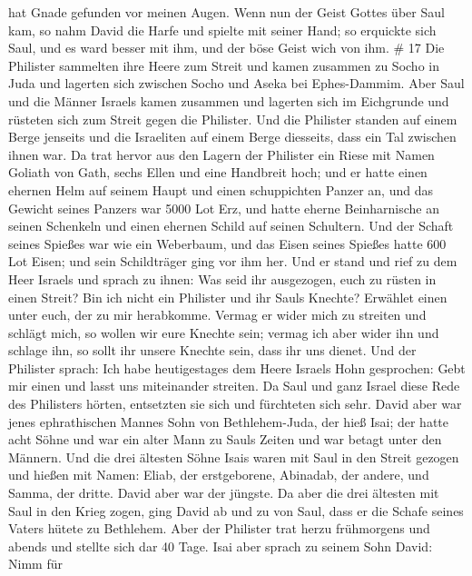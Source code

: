 hat Gnade gefunden vor meinen Augen.  Wenn nun der Geist
Gottes über Saul kam, so nahm David die Harfe und spielte mit seiner
Hand; so erquickte sich Saul, und es ward besser mit ihm, und der böse
Geist wich von ihm. \# 17  Die Philister sammelten ihre
Heere zum Streit und kamen zusammen zu Socho in Juda und lagerten sich
zwischen Socho und Aseka bei Ephes-Dammim.  Aber Saul und
die Männer Israels kamen zusammen und lagerten sich im Eichgrunde und
rüsteten sich zum Streit gegen die Philister.  Und die
Philister standen auf einem Berge jenseits und die Israeliten auf einem
Berge diesseits, dass ein Tal zwischen ihnen war.  Da trat
hervor aus den Lagern der Philister ein Riese mit Namen Goliath von
Gath, sechs Ellen und eine Handbreit hoch;  und er hatte
einen ehernen Helm auf seinem Haupt und einen schuppichten Panzer an,
und das Gewicht seines Panzers war 5000 Lot Erz,  und hatte
eherne Beinharnische an seinen Schenkeln und einen ehernen Schild auf
seinen Schultern.  Und der Schaft seines Spießes war wie ein
Weberbaum, und das Eisen seines Spießes hatte 600 Lot Eisen; und sein
Schildträger ging vor ihm her.  Und er stand und rief zu dem
Heer Israels und sprach zu ihnen: Was seid ihr ausgezogen, euch zu
rüsten in einen Streit? Bin ich nicht ein Philister und ihr Sauls
Knechte? Erwählet einen unter euch, der zu mir herabkomme. 
Vermag er wider mich zu streiten und schlägt mich, so wollen wir eure
Knechte sein; vermag ich aber wider ihn und schlage ihn, so sollt ihr
unsere Knechte sein, dass ihr uns dienet.  Und der
Philister sprach: Ich habe heutigestages dem Heere Israels Hohn
gesprochen: Gebt mir einen und lasst uns miteinander streiten.
 Da Saul und ganz Israel diese Rede des Philisters hörten,
entsetzten sie sich und fürchteten sich sehr.  David aber
war jenes ephrathischen Mannes Sohn von Bethlehem-Juda, der hieß Isai;
der hatte acht Söhne und war ein alter Mann zu Sauls Zeiten und war
betagt unter den Männern.  Und die drei ältesten Söhne
Isais waren mit Saul in den Streit gezogen und hießen mit Namen: Eliab,
der erstgeborene, Abinadab, der andere, und Samma, der dritte.
 David aber war der jüngste. Da aber die drei ältesten mit
Saul in den Krieg zogen,  ging David ab und zu von Saul,
dass er die Schafe seines Vaters hütete zu Bethlehem.  Aber
der Philister trat herzu frühmorgens und abends und stellte sich dar 40
Tage.  Isai aber sprach zu seinem Sohn David: Nimm für
